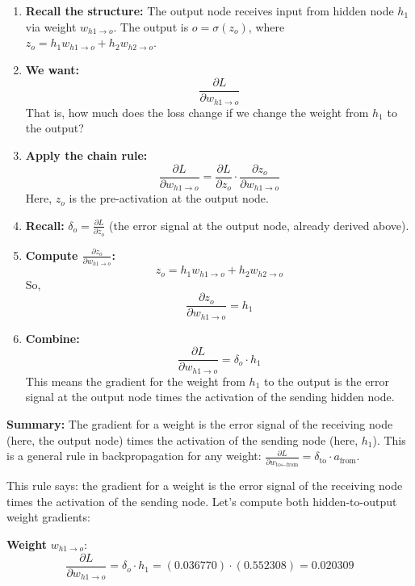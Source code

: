 \documentclass[12pt]{article}
\begin{document}
\begin{enumerate}
    \item \textbf{Recall the structure:} The output node receives input from hidden node $h_1$ via weight $w_{h1 \to o}$. The output is $o = \sigma(z_o)$, where $z_o = h_1 w_{h1 \to o} + h_2 w_{h2 \to o}$.

    \item \textbf{We want:}
    \[
    \frac{\partial L}{\partial w_{h1 \to o}}
    \]
    That is, how much does the loss change if we change the weight from $h_1$ to the output?

    \item \textbf{Apply the chain rule:}
    \[
    \frac{\partial L}{\partial w_{h1 \to o}} = \frac{\partial L}{\partial z_o} \cdot \frac{\partial z_o}{\partial w_{h1 \to o}}
    \]
    Here, $z_o$ is the pre-activation at the output node.

    \item \textbf{Recall:} $\delta_o = \frac{\partial L}{\partial z_o}$ (the error signal at the output node, already derived above).

    \item \textbf{Compute $\frac{\partial z_o}{\partial w_{h1 \to o}}$:}
    \[
    z_o = h_1 w_{h1 \to o} + h_2 w_{h2 \to o}
    \]
    So,
    \[
    \frac{\partial z_o}{\partial w_{h1 \to o}} = h_1
    \]

    \item \textbf{Combine:}
    \[
    \frac{\partial L}{\partial w_{h1 \to o}} = \delta_o \cdot h_1
    \]
    This means the gradient for the weight from $h_1$ to the output is the error signal at the output node times the activation of the sending hidden node.
\end{enumerate}

\noindent\textbf{Summary:} The gradient for a weight is the error signal of the receiving node (here, the output node) times the activation of the sending node (here, $h_1$). This is a general rule in backpropagation for any weight: $\frac{\partial L}{\partial w_{\text{to} \gets \text{from}}} = \delta_{\text{to}} \cdot a_{\text{from}}$.

This rule says: the gradient for a weight is the error signal of the receiving node times the activation of the sending node. Let's compute both hidden-to-output weight gradients:

\noindent\textbf{Weight } $w_{h1 \to o}$:
\[
\frac{\partial L}{\partial w_{h1 \to o}} = \delta_o \cdot h_1 = (0.036770) \cdot (0.552308) = 0.020309
\]
\end{document}
